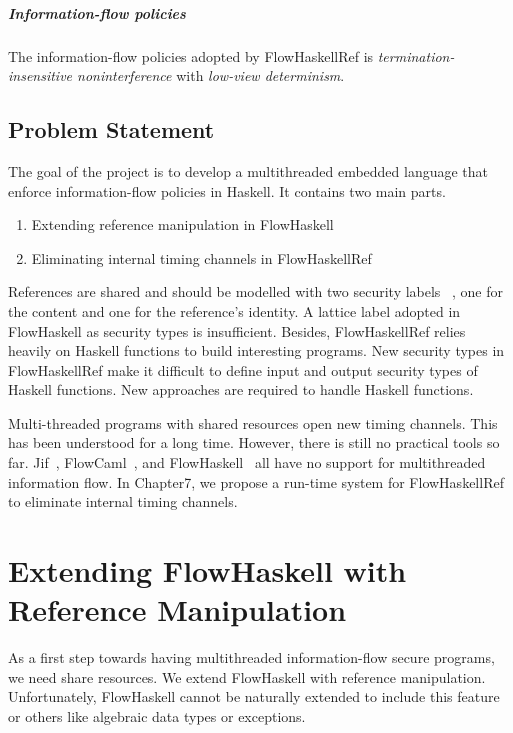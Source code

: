 \documentclass{report}
\begin{document}
\paragraph{Information-flow policies}
The information-flow policies adopted by FlowHaskellRef is {\em termination-insensitive
noninterference} with {\em low-view determinism}.

\section{Problem Statement}
The goal of the project is to develop a multithreaded embedded language that enforce information-flow policies
in Haskell. It contains two main parts. 
\begin{enumerate}
\item Extending reference manipulation in FlowHaskell
\item Eliminating internal timing channels in FlowHaskellRef
\end{enumerate}

References are shared and should be modelled with two security labels~\cite{Pottier:Simonet:POPL02}
, one for the content and one for the 
reference's identity. A lattice label adopted in FlowHaskell as security types is insufficient. 
Besides, FlowHaskellRef relies heavily on Haskell functions to build interesting programs. New security types in
FlowHaskellRef make it difficult to define input and output security types of Haskell functions.
New approaches are required to handle Haskell functions.

Multi-threaded programs with shared resources open new timing channels. This has been understood for a long time. 
However, there is still no practical tools so far. Jif~\cite{jif}, FlowCaml~\cite{FlowCaml}, and 
FlowHaskell~\cite{Li:Zdancewic:CSFW} all have no support for multithreaded information flow.
In Chapter7, we propose a run-time system for FlowHaskellRef to eliminate internal timing channels.


\chapter{Extending FlowHaskell with Reference Manipulation}

As a first step towards having multithreaded information-flow secure
programs, we need share resources. We extend FlowHaskell with
reference manipulation. Unfortunately, FlowHaskell cannot be 
naturally extended to include this feature or others like algebraic
data types or exceptions.
\end{document}

